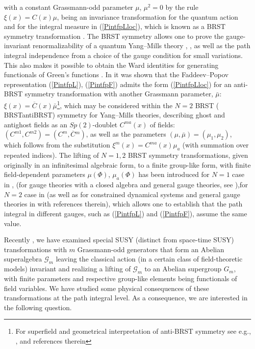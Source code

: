 \documentclass[10pt]{article}
\begin{document}
with a constant Grassmann-odd parameter $\mu$, $\mu^2=0$ by the rule  $\xi(x)=C(x)\mu$,
being an invariance transformation for the quantum action and for the integral measure
in (\ref{PintfpLloc}), which is known as a BRST symmetry transformation \cite{brs, brs1}.
The BRST symmetry allows one to prove the gauge-invariant renormalizability of a quantum Yang--Mills
theory \cite{Slavnov}, \cite{Slavnov1}, as well as the path integral independence
from a choice of the gauge condition for small variations. This also makes it possible
to obtain the Ward identities for generating functionals of Green's functions \cite{ZinnJustin}.  In \cite{aBRST1, aBRST2} it was shown that the Faddeev--Popov representation (\ref{PintfpL}), (\ref{PintfpF}) admits the form (\ref{PintfpLloc}) for an anti-BRST symmetry transformation with another Grassmann parameter, $\bar{\mu}$:  $\xi(x)=\overline{C}(x)\bar{\mu}$\footnote{For superfield and geometrical interpretation of anti-BRST symmetry see e.g.\cite{Bonora}, \cite{Gregoire}, \cite{Varshovi} and references therein},  which may be considered within the $N=2$ BRST  ( BRSTantiBRST) symmetry \cite{aBRST3} for Yang--Mills theories, describing ghost and antighost fields as an $Sp(2)$-doublet $C^{m{}a}(x)$ of fields: $(C^{m{}1}, C^{m{}2})=(C^{m}, \overline{C}{}^{m})$, as well as the parameters $(\mu, \bar{\mu})= (\mu_1, \mu_2)$, which follows from the substitution $\xi^m(x)= C^{m{}a}(x){\mu}_a$ (with summation over repeated indices).  The lifting of $N=1, 2$ BRST symmetry transformations, given originally in an infinitesimal algebraic form, to a finite group-like form, with finite field-dependent parameters $\mu(\Phi)$, $\mu_a(\Phi)$ has been introduced for $N=1$ case in \cite{sdj}, \cite{ll1} (for gauge theories with a
closed algebra and general gauge theories, see \cite{re}),for $N=2$ case in \cite{re1} (as well as for constrained dynamical systems and general gauge theories in \cite{MR2, MR3, MR4, MR5} with references therein), which allows one to establish that the path integral in different gauges, such as  (\ref{PintfpL}) and  (\ref{PintfpF}), assume the same value.

Recently \cite{UMR}, we have examined special SUSY (distinct from
space-time SUSY)
transformations with $m$ Grassmann-odd generators that form an Abelian superalgebra
$\mathcal{G}_m$ leaving the classical action (in a certain class of field-theoretic models)
invariant and realizing a lifting of  $\mathcal{G}_m$ to an Abelian supergroup ${G}_m$,
with finite parameters and respective group-like elements being functionals of field variables.
We have studied some physical consequences of these transformations at the path integral level.
As a consequence, we are interested in the following question.
\end{document}
